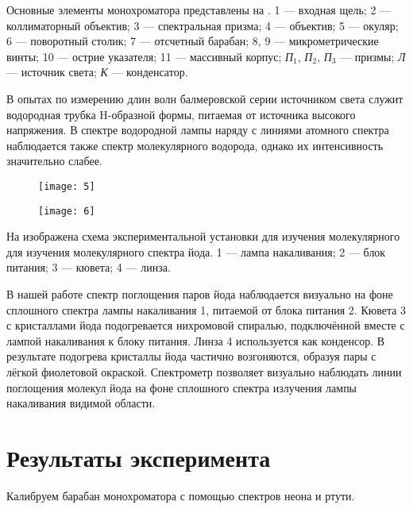 \documentclass[a4paper, 12pt]{article}
\begin{document}
Основные элементы монохроматора представлены на . 1 ---
входная щель; 2 --- коллиматорный объектив; 3 --- спектральная призма;
4 --- объектив; 5 --- окуляр; 6 --- поворотный столик; 7 --- отсчетный
барабан; 8, 9 --- микрометрические винты; 10 --- острие указателя; 11
--- массивный корпус; \textsl{П}$_{1}$, \textsl{П}$_{2}$,
\textsl{П}$_{3}$ --- призмы; \textsl{Л} --- источник света;
\textsl{К} --- конденсатор.

В опытах по измерению длин волн балмеровской серии источником света
служит водородная трубка H-образной формы, питаемая от источника
высокого напряжения. В спектре водородной лампы наряду с линиями
атомного спектра наблюдается также спектр молекулярного водорода,
однако их интенсивность значительно слабее.


\begin{figure}[H]
    \begin{floatrow}

        {
        \texttt{[image: 5]}
        \label{fig:5}
    }

        {
        \texttt{[image: 6]}
        \label{fig:6}
    }
    \end{floatrow}
\end{figure}

На  изображена схема экспериментальной установки для
изучения молекулярного для изучения молекулярного спектра йода. 1
--- лампа накаливания; 2 --- блок питания; 3 --- кювета; 4 --- линза.

В нашей работе спектр поглощения паров йода наблюдается визуально на
фоне сплошного спектра лампы накаливания 1, питаемой от блока питания
2. Кювета 3 с кристаллами йода подогревается нихромовой спиралью,
подключённой вместе с лампой накаливания к блоку питания. Линза 4
используется как конденсор. В результате подогрева кристаллы йода
частично возгоняются, образуя пары с лёгкой фиолетовой окраской.
Спектрометр позволяет визуально наблюдать линии поглощения молекул
йода на фоне сплошного спектра излучения лампы накаливания видимой
области.


\section{Результаты эксперимента}
Калибруем барабан монохроматора с помощью спектров неона и ртути.
\end{document}
